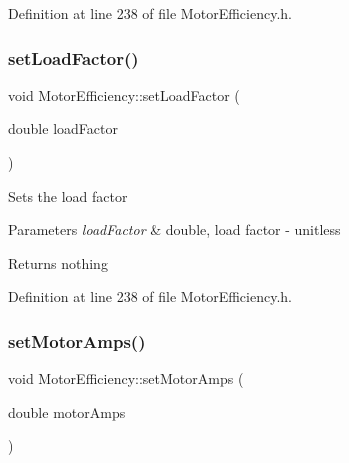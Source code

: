 Definition at line 238 of file Motor\+Efficiency.\+h.

\mbox{\label{class_motor_efficiency_ad6a7b0eb436378f36ceb8a0cec121786}} 
\subsubsection{\texorpdfstring{set\+Load\+Factor()}{setLoadFactor()}\hspace{0.1cm}{\footnotesize\ttfamily [3/3]}}
{\footnotesize\ttfamily void Motor\+Efficiency\+::set\+Load\+Factor (\begin{DoxyParamCaption}\item[{double}]{load\+Factor }\end{DoxyParamCaption})\hspace{0.3cm}{\ttfamily [inline]}}

Sets the load factor


\begin{DoxyParams}{Parameters}
{\em load\+Factor} & double, load factor -\/ unitless\\
\hline
\end{DoxyParams}
\begin{DoxyReturn}{Returns}
nothing 
\end{DoxyReturn}


Definition at line 238 of file Motor\+Efficiency.\+h.

\mbox{\label{class_motor_efficiency_ac86aa8d6162e63eb440e07e557534c74}} 
\subsubsection{\texorpdfstring{set\+Motor\+Amps()}{setMotorAmps()}\hspace{0.1cm}{\footnotesize\ttfamily [1/3]}}
{\footnotesize\ttfamily void Motor\+Efficiency\+::set\+Motor\+Amps (\begin{DoxyParamCaption}\item[{double}]{motor\+Amps }\end{DoxyParamCaption})\hspace{0.3cm}{\ttfamily [inline]}}

